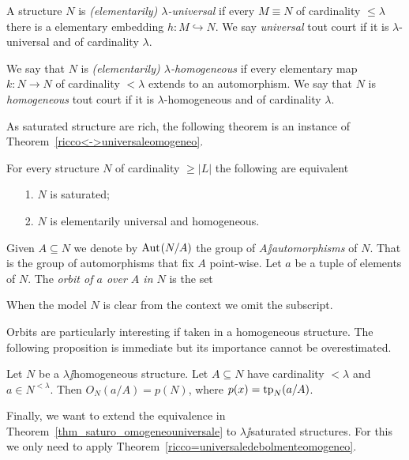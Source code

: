 \documentclass[creche.tex]{subfiles}
\begin{document}
\begin{definition}
A structure $N$ is \emph{(elementarily) $\lambda$-universal\/} if every $M\equiv N$ of cardinality $\le\lambda$ there is a elementary embedding $h:M\hookrightarrow N$. We say  \emph{universal\/} tout court if it is $\lambda$-universal and of cardinality $\lambda$.

We say that $N$ is \emph{(elementarily) $\lambda$-homogeneous\/} if every elementary map $k:N\to N$ of cardinality $<\lambda$ extends to an automorphism. We say that $N$ is \emph{homogeneous\/} tout court if it is $\lambda$-homogeneous and of cardinality $\lambda$.\QED
\end{definition}

As saturated structure are rich, the following theorem is an instance of Theorem~\ref{ricco<->universaleomogeneo}.

\begin{theorem}\label{thm_saturo_omogeneouniversale}
For every structure $N$ of cardinality $\ge|L|$ the following are equivalent\nobreak
\begin{itemize}
\item[1.] $N$ is saturated;
\item[2.] $N$ is elementarily universal and homogeneous.\QED
\end{itemize}
\end{theorem}

Given $A\subseteq N$ we denote by \emph{$\textrm{Aut\kern.15ex}(N/A)$\/} the group of \emph{$A\jj$automorphisms\/} of $N$. That is the group of automorphisms that fix $A$ point-wise. Let $a$ be a tuple of elements of $N$. The \emph{orbit of $a$ over $A$ in $N$} is the set


When the model $N$ is clear from the context we omit the subscript.

Orbits are particularly interesting if taken in a homogeneous structure. The following proposition is immediate but its importance cannot be overestimated.

\begin{proposition}\label{omogeneitaorbitetipi}
Let $N$ be a $\lambda\jj$homogeneous structure. Let $A\subseteq N$ have cardinality $<\lambda$ and $a\in N^{<\lambda}$. Then $O_N(a/A)=p(N)$, where $p(x)={\rm tp}_N(a/A)$.\QED
\end{proposition}


Finally, we want to extend the equivalence in Theorem~\ref{thm_saturo_omogeneouniversale} to $\lambda\jj$saturated structures. For this we only need to apply Theorem~\ref{ricco=universaledebolmenteomogeneo}. 
\end{document}
